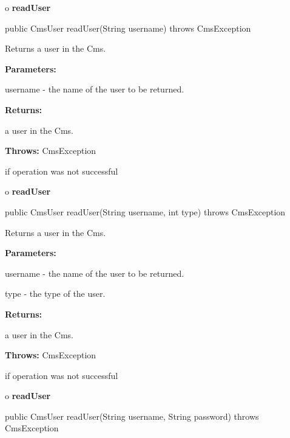 o {\bf readUser} 

\begin{PRE}
 public CmsUser readUser(String username) throws CmsException
\end{PRE}

\begin{description}
\htmlDD Returns a user in the Cms. 

\begin{description}
\item {\bf Parameters:}  

username - the name of the user to be returned.  
\item {\bf Returns:}  

a user in the Cms.  
\item {\bf Throws:} CmsException  

if operation was not successful  
\end{description}

\end{description}

o {\bf readUser} 

\begin{PRE}
 public CmsUser readUser(String username,
                         int type) throws CmsException
\end{PRE}

\begin{description}
\htmlDD Returns a user in the Cms. 

\begin{description}
\item {\bf Parameters:}  

username - the name of the user to be returned.  

type - the type of the user.  
\item {\bf Returns:}  

a user in the Cms.  
\item {\bf Throws:} CmsException  

if operation was not successful  
\end{description}

\end{description}

o {\bf readUser} 

\begin{PRE}
 public CmsUser readUser(String username,
                         String password) throws CmsException
\end{PRE}

